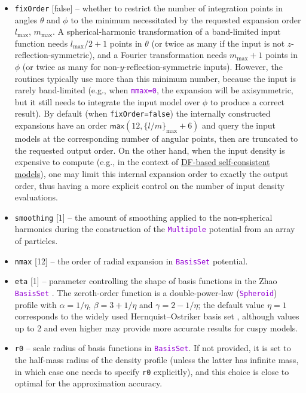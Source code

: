 \documentclass[12pt]{article}
\newcommand{\ttt}[1]{\textcolor{darkviolet}{\texttt{#1}}}
\newcommand{\ppp}[1]{\textcolor{darkolive} {\texttt{#1}}}
\begin{document}
\begin{itemize}
\item \ppp{fixOrder} [false] -- whether to restrict the number of integration points in angles $\theta$ and $\phi$ to the minimum necessitated by the requested expansion order $l_\mathrm{max}$, $m_\mathrm{max}$. A spherical-harmonic transformation of a band-limited input function needs $l_\mathrm{max}/2+1$ points in $\theta$ (or twice as many if the input is not $z$-reflection-symmetric), and a Fourier transformation needs $m_\mathrm{max}+1$ points in $\phi$ (or twice as many for non-$y$-reflection-symmetric inputs). However, the routines typically use more than this minimum number, because the input is rarely band-limited (e.g., when \ttt{mmax=0}, the expansion will be axisymmetric, but it still needs to integrate the input model over $\phi$ to produce a correct result). By default (when \ppp{fixOrder=false}) the internally constructed expansions have an order $\mathsf{max}(12, \{l/m\}_\mathrm{max}+6)$ and query the input models at the corresponding number of angular points, then are truncated to the requested output order. On the other hand, when the input density is expensive to compute (e.g., in the context of \hyperref[sec:SCM]{DF-based self-consistent models}), one may limit this internal expansion order to exactly the output order, thus having a more explicit control on the number of input density evaluations.
\item \ppp{smoothing} [1] -- the amount of smoothing applied to the non-spherical harmonics during the construction of the \ttt{Multipole} potential from an array of particles.
\item \ppp{nmax} [12] -- the order of radial expansion in \ttt{BasisSet} potential.
\item \ppp{eta} [1] -- parameter controlling the shape of basis functions in the Zhao \ttt{BasisSet} \cite{Zhao1996}. The zeroth-order function is a double-power-law (\ttt{Spheroid}) profile with $\alpha=1/\eta$, $\beta=3+1/\eta$ and $\gamma=2-1/\eta$; the default value $\eta=1$ corresponds to the widely used Hernquist--Ostriker basis set \cite{HernquistOstriker1992}, although values up to 2 and even higher may provide more accurate results for cuspy models.
\item \ppp{r0} -- scale radius of basis functions in \ttt{BasisSet}. If not provided, it is set to the half-mass radius of the density profile (unless the latter has infinite mass, in which case one needs to specify \ppp{r0} explicitly), and this choice is close to optimal for the approximation accuracy.
\end{itemize}
\end{document}
